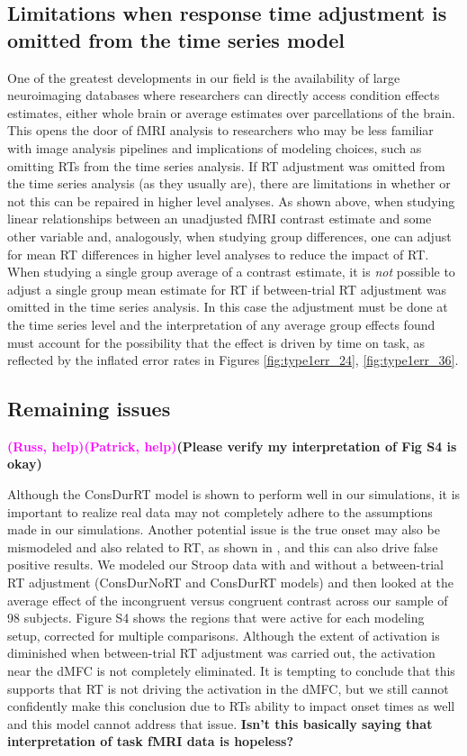 \documentclass[titlepage,12pt] {article}
\newcommand{\rh}{\textcolor{magenta}{\textbf{(Russ, help)}}}
\newcommand{\ph}{\textcolor{magenta}{\textbf{(Patrick, help)}}}
\begin{document}
\subsection*{Limitations when response time adjustment is omitted from the time series model} 
One of the greatest developments in our field is the availability of large neuroimaging databases where researchers can directly access condition effects estimates, either whole brain or average estimates over parcellations of the brain.  This opens the door of fMRI analysis to researchers who may be less familiar with image analysis pipelines and implications of modeling choices, such as omitting RTs from the time series analysis.  If RT adjustment was omitted from the time series analysis (as they usually are), there are limitations in whether or not this can be repaired in higher level analyses.  As shown above, when studying linear relationships between an unadjusted fMRI contrast estimate and some other variable and, analogously, when studying group differences, one can adjust for mean RT differences in higher level analyses to reduce the impact of RT. When studying a single group average of a contrast estimate, it is \emph{not} possible to adjust a single group mean estimate for RT if between-trial RT adjustment was omitted in the time series analysis.  In this case the adjustment must be done at the time series level and the interpretation of any average group effects found must account for the possibility that the effect is driven by time on task, as reflected by the inflated error rates in Figures \ref{fig:type1err_24}, \ref{fig:type1err_36}.  



\subsection*{Remaining issues} 
\rh\ph\textbf{(Please verify my interpretation of Fig S4 is okay)}

Although the ConsDurRT model is shown to perform well in our simulations, it is important to realize real data may not completely adhere to the assumptions made in our simulations.  Another potential issue is the true onset may also be mismodeled and also related to RT, as shown in \citet{yarkoni_bold_2009}, and this can also drive false positive results.  We modeled our Stroop data with and without a between-trial RT adjustment (ConsDurNoRT and ConsDurRT models) and then looked at the average effect of the incongruent versus congruent contrast across our sample of 98 subjects.  Figure S4 shows the regions that were active for each modeling setup, corrected for multiple comparisons.  Although the extent of activation is diminished when between-trial RT adjustment was carried out, the activation near the dMFC is not completely eliminated. It is tempting to conclude that this supports that RT is not driving the activation in the dMFC, but we still cannot confidently make this conclusion due to RTs ability to impact onset times as well and this model cannot address that issue.  \textbf{Isn't this basically saying that interpretation of task fMRI data is hopeless?}
\end{document}

